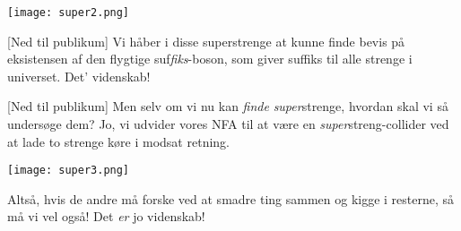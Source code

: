 \documentclass[a4paper,11pt]{article}
\begin{document}
\begin{sketch}
\texttt{[image: super2.png]}

[Ned til publikum] Vi håber i disse superstrenge at kunne
finde bevis på eksistensen af den flygtige
suf\textit{fiks}-boson,  som giver suffiks til alle strenge
i universet.  Det' videnskab!

[Ned til publikum] Men selv om vi nu kan \textit{finde}
\textit{super}strenge, hvordan skal vi så undersøge dem? 
Jo, vi udvider vores NFA til at være en \textit{super}streng-collider
ved at lade to strenge køre i modsat retning.

\texttt{[image: super3.png]}

 Altså, hvis de andre må forske ved at smadre ting sammen og
kigge i resterne, så må vi vel også!  Det \textit{er} jo videnskab!


\end{sketch}
\end{document}
